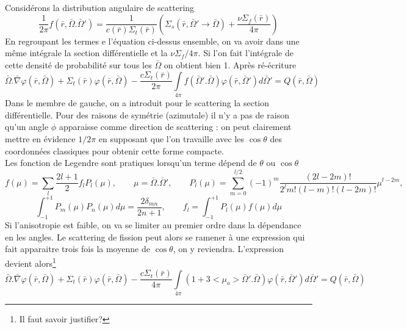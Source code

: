 Considérons la distribution angulaire de scattering
\begin{equation}
\frac{1}{{2\pi }}f(\bar r,\bar \Omega .\bar \Omega ') = \frac{1}{{c(\bar r){\Sigma _t}(\bar r)}}({\Sigma _s}(\bar r,\bar \Omega ' \to \bar \Omega ) + \frac{{\nu {\Sigma _f}(\bar r)}}{{4\pi }})
\end{equation}
En regroupant les termes e l'équation ci-dessus ensemble, on va avoir dans une même intégrale la 
section différentielle et la $\nu\Sigma_f/4\pi$. Si l'on fait l'intégrale de cette densité de 
probabilité sur tous les $\bar\Omega$ on obtient bien 1.  Après ré-écriture
\begin{equation}
\bar \Omega .\bar \nabla \varphi (\bar r,\bar \Omega ) + {\Sigma _t}(\bar r)\varphi (\bar r,\bar \Omega ) - \frac{{c{\Sigma _t}(\bar r)}}{{2\pi }}\int\limits_{4\pi }    f(\bar \Omega '.\bar \Omega )\varphi (\bar r,\bar \Omega ')d\bar \Omega ' = Q(\bar r,\bar \Omega )
\end{equation}
Dans le membre de gauche, on a introduit pour le scattering la section différentielle. Pour des 
raisons de symétrie (azimutale) il n'y a pas de raison qu'un angle $\phi$ apparaisse comme 
direction de scattering : on peut clairement mettre en évidence $1/2\pi$ en supposant que l'on 
travaille avec les $\cos\theta$ des coordonnées classiques pour obtenir cette forme compacte.\\

Les fonction de Legendre sont pratiques lorsqu'un terme dépend de $\theta$ ou $\cos\theta$
\begin{equation}
f(\mu ) = \sum\limits_l    \frac{{2l + 1}}{2}{f_l}{P_l}(\mu ),\qquad \mu  = \bar \Omega .\bar \Omega ',\qquad {P_l}(\mu ) = \sum\limits_{m = 0}^{l/2}    {( - 1)^m}\frac{{(2l - 2m)!}}{{{2^l}m!(l - m)!(l - 2m)!}}{\mu ^{l - 2m}},
\end{equation}
\begin{equation}
\int_{ - 1}^{ + 1}    {P_m}(\mu ){P_n}(\mu )d\mu  = \frac{{2{\delta _{mn}}}}{{2n + 1}}, \qquad
{f_l} = \int_{ - 1}^{ + 1} {  {P_l}(\mu )f(\mu )d\mu } 
\end{equation}
Si l'anisotropie est faible, on va se limiter au premier ordre dans la dépendance en les angles. Le 
scattering de fission peut alors se ramener à une expression qui fait apparaitre trois fois la 
moyenne de $\cos\theta$, on y reviendra. L'expression devient alors\footnote{Il faut savoir justifier?}
\begin{equation}
\bar \Omega .\bar \nabla \varphi (\bar r,\bar \Omega ) + {\Sigma _t}(\bar r)\varphi (\bar r,\bar \Omega ) - \frac{{c{\Sigma _t}(\bar r)}}{{4\pi }}\int\limits_{4\pi }    (1 + 3 < {\mu _o} > \bar \Omega '.\bar \Omega )\varphi (\bar r,\bar \Omega ')d\bar \Omega ' = Q(\bar r,\bar \Omega )
\end{equation}


